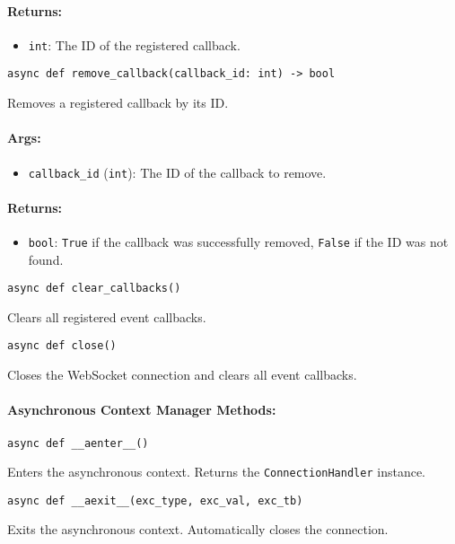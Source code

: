 \documentclass{article}
\begin{document}
\paragraph{Returns:}
\begin{itemize}
    \item \texttt{int}: The ID of the registered callback.
\end{itemize}

\noindent\texttt{async def remove\_callback(callback\_id: int) -> bool}

\noindent Removes a registered callback by its ID.

\paragraph{Args:}
\begin{itemize}
    \item \texttt{callback\_id} (\texttt{int}): The ID of the callback to remove.
\end{itemize}

\paragraph{Returns:}
\begin{itemize}
    \item \texttt{bool}: \texttt{True} if the callback was successfully removed, \texttt{False} if the ID was not found.
\end{itemize}

\noindent\texttt{async def clear\_callbacks()}

\noindent Clears all registered event callbacks.

\noindent\texttt{async def close()}

\noindent Closes the WebSocket connection and clears all event callbacks.

\paragraph{Asynchronous Context Manager Methods:}
\noindent\texttt{async def \_\_aenter\_\_()}

\noindent Enters the asynchronous context. Returns the \texttt{ConnectionHandler} instance.

\noindent\texttt{async def \_\_aexit\_\_(exc\_type, exc\_val, exc\_tb)}

\noindent Exits the asynchronous context. Automatically closes the connection.
\end{document}
